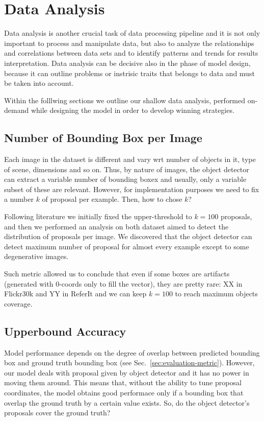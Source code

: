\section{Data Analysis}
\label{sec:data-analysis}

Data analysis is another crucial task of data processing pipeline and
it is not only important to process and manipulate data, but also to
analyze the relationships and correlations between data sets and to
identify patterns and trends for results interpretation.  Data analysis can be
decisive also in the phase of model design, because it can outline
problems or instrisic traits that belongs to data and must be taken
into account.

Within the folllwing sections we outline our shallow data analysis,
performed on-demand while designing the model in order to develop
winning strategies.

\subsection{Number of Bounding Box per Image}
\label{subsec:num-of-proposals}

Each image in the dataset is different and vary wrt number of objects
in it, type of scene, dimensions and so on. Thus, by nature of images,
the object detector can extract a variable number of bounding boxex
and usually, only a variable subset of these are relevant. However,
for implementation purposes we need to fix a number $k$ of proposal
per example. Then, how to chose $k$? 

Following literature we initially fixed the upper-threshold to $k =
100$ proposals, and then we performed an analysis on both dataset
aimed to detect the distribution of proposals per image. We discovered
that the object detector can detect maximum number of proposal for
almost every example except to some degenerative images.

Such metric allowed us to conclude that even if some boxes are
artifacts (generated with $0$-coords only to fill the vector), they
are pretty rare: XX in Flickr30k and YY in ReferIt 
and we can keep $k = 100$ to reach maximum objects coverage.

\subsection{Upperbound Accuracy}

Model performance depends on the degree of overlap between predicted
bounding box and ground truth bounding box (see
Sec.~\ref{sec:evaluation-metric}). However, our model deals with
proposal given by object detector and it has no power in moving them
around. This means that, without the ability to tune proposal
coordinates, the model obtains good performace only if a bounding box
that overlap the ground truth by a certain value exists. So, do the
object detector's proposals cover the ground truth?


